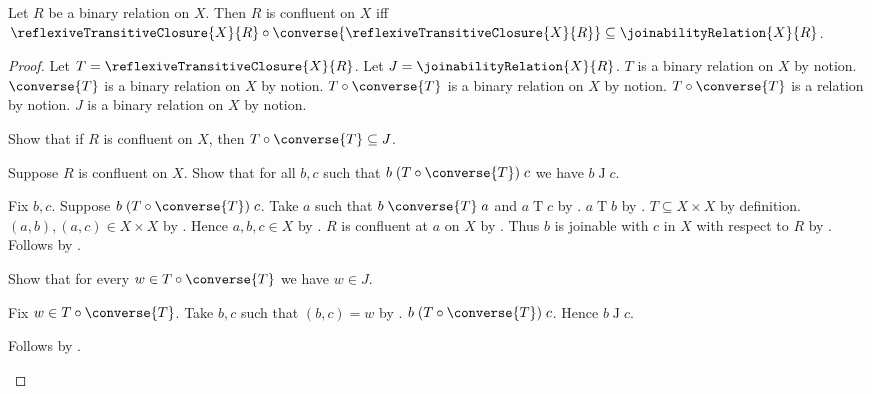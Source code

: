 \begin{proposition}\label{confluent_on_iff_peak_relation}
    Let $R$ be a binary relation on $X$.
    Then $R$ is confluent on $X$ iff
        $\reflexiveTransitiveClosure{X}{R}\circ
            \converse{\reflexiveTransitiveClosure{X}{R}}
        \subseteq\joinabilityRelation{X}{R}$.
\end{proposition}
\begin{proof}
    Let $T=\reflexiveTransitiveClosure{X}{R}$.
    Let $J=\joinabilityRelation{X}{R}$.
    $T$ is a binary relation on $X$ by notion.
    $\converse{T}$ is a binary relation on $X$ by notion.
    $T\circ\converse{T}$ is a binary relation on $X$ by notion.
    $T\circ\converse{T}$ is a relation by notion.
    $J$ is a binary relation on $X$ by notion.

    Show that if $R$ is confluent on $X$, then
        $T\circ\converse{T}\subseteq J$.
    \begin{subproof}
        Suppose $R$ is confluent on $X$.
        Show that for all $b,c$ such that
            $b\mathrel{(T\circ\converse{T})}c$ we have $b\mathrel{J}c$.
        \begin{subproof}
            Fix $b,c$.
            Suppose $b\mathrel{(T\circ\converse{T})}c$.
            Take $a$ such that $b\mathrel{\converse{T}}a$ and
                $a\mathrel{T}c$ by .
            $a\mathrel{T}b$ by .
            $T\subseteq X\times X$ by definition.
            $(a,b),(a,c)\in X\times X$ by .
            Hence $a,b,c\in X$ by .
            $R$ is confluent at $a$ on $X$ by .
            Thus $b$ is joinable with $c$ in $X$ with respect to $R$
                by .
            Follows by .
        \end{subproof}
        Show that for every $w\in T\circ\converse{T}$ we have $w\in J$.
        \begin{subproof}
            Fix $w\in T\circ\converse{T}$.
            Take $b,c$ such that $(b,c)=w$ by .
            $b\mathrel{(T\circ\converse{T})}c$.
            Hence $b\mathrel{J}c$.
        \end{subproof}
        Follows by .
    \end{subproof}


\end{proof}
